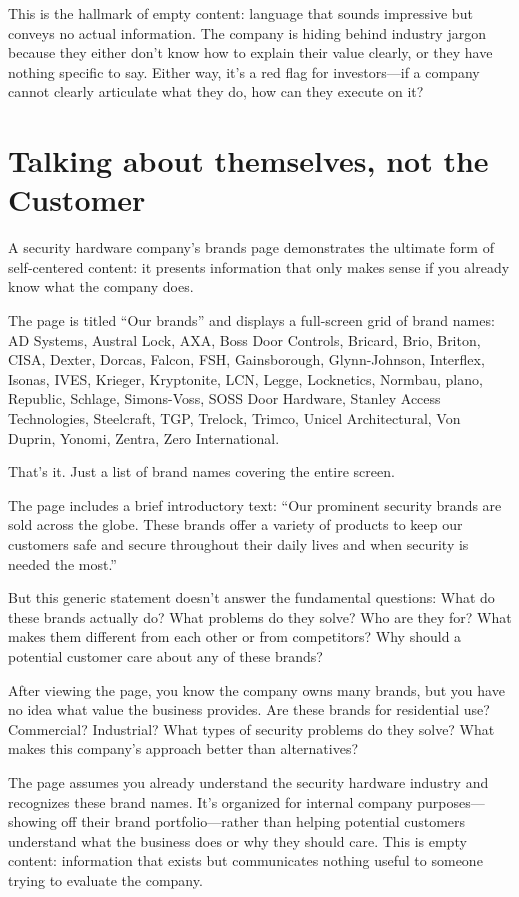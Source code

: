 This is the hallmark of empty content: language that sounds impressive but conveys no actual information. The company is hiding behind industry jargon because they either don't know how to explain their value clearly, or they have nothing specific to say. Either way, it's a red flag for investors—if a company cannot clearly articulate what they do, how can they execute on it?

\section{Talking about themselves, not the Customer}

A security hardware company's brands page demonstrates the ultimate form of self-centered content: it presents information that only makes sense if you already know what the company does.

The page is titled ``Our brands'' and displays a full-screen grid of brand names: AD Systems, Austral Lock, AXA, Boss Door Controls, Bricard, Brio, Briton, CISA, Dexter, Dorcas, Falcon, FSH, Gainsborough, Glynn-Johnson, Interflex, Isonas, IVES, Krieger, Kryptonite, LCN, Legge, Locknetics, Normbau, plano, Republic, Schlage, Simons-Voss, SOSS Door Hardware, Stanley Access Technologies, Steelcraft, TGP, Trelock, Trimco, Unicel Architectural, Von Duprin, Yonomi, Zentra, Zero International.

That's it. Just a list of brand names covering the entire screen.

The page includes a brief introductory text: ``Our prominent security brands are sold across the globe. These brands offer a variety of products to keep our customers safe and secure throughout their daily lives and when security is needed the most.''

But this generic statement doesn't answer the fundamental questions: What do these brands actually do? What problems do they solve? Who are they for? What makes them different from each other or from competitors? Why should a potential customer care about any of these brands?

After viewing the page, you know the company owns many brands, but you have no idea what value the business provides. Are these brands for residential use? Commercial? Industrial? What types of security problems do they solve? What makes this company's approach better than alternatives?

The page assumes you already understand the security hardware industry and recognizes these brand names. It's organized for internal company purposes—showing off their brand portfolio—rather than helping potential customers understand what the business does or why they should care. This is empty content: information that exists but communicates nothing useful to someone trying to evaluate the company.

